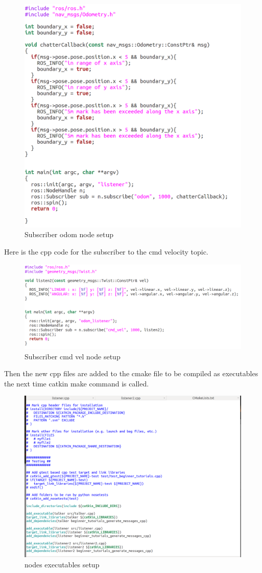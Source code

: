 \documentclass[a4paper, 10pt]{IEEEconf}
\begin{document}
\begin{figure}[H]
  \includegraphics[width=0.8\linewidth, center]{images/odomcode}
  \caption{Subscriber odom node setup}
  \label{fig:Subscriber odom node setup}
\end{figure}

Here is the cpp code for the subscriber to the cmd velocity topic.

\begin{figure}[H]
  \includegraphics[width=0.8\linewidth, center]{images/cmdvelcode}
  \caption{Subscriber cmd vel node setup}
  \label{fig:Subscriber cmd vel node setup}
\end{figure}

\clearpage
Then the new cpp files are added to the cmake file to be compiled as executables the next time catkin make command is called.

\begin{figure}[H]
  \includegraphics[width=0.8\linewidth, center]{images/exe}
  \caption{nodes executables setup}
  \label{fig:nodes executables setup}
\end{figure}
\end{document}
